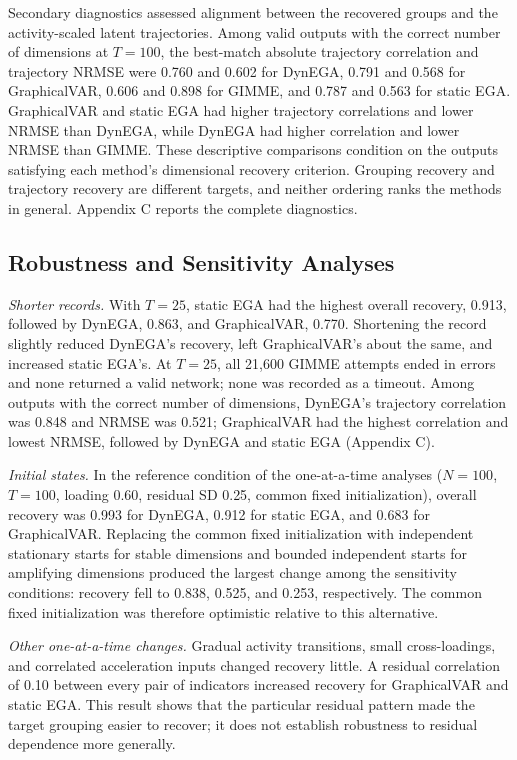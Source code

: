 \documentclass[
]{article}
\begin{document}
Secondary diagnostics assessed alignment between the recovered groups
and the activity-scaled latent trajectories. Among valid outputs with
the correct number of dimensions at \(T=100\), the best-match absolute
trajectory correlation and trajectory NRMSE were 0.760 and 0.602 for
DynEGA, 0.791 and 0.568 for GraphicalVAR, 0.606 and 0.898 for GIMME, and
0.787 and 0.563 for static EGA. GraphicalVAR and static EGA had higher
trajectory correlations and lower NRMSE than DynEGA, while DynEGA had
higher correlation and lower NRMSE than GIMME. These descriptive
comparisons condition on the outputs satisfying each method's
dimensional recovery criterion. Grouping recovery and trajectory
recovery are different targets, and neither ordering ranks the methods
in general. Appendix C reports the complete diagnostics.

\subsection{Robustness and Sensitivity
Analyses}\label{robustness-and-sensitivity-analyses}

\emph{Shorter records.} With \(T=25\), static EGA had the highest
overall recovery, 0.913, followed by DynEGA, 0.863, and GraphicalVAR,
0.770. Shortening the record slightly reduced DynEGA's recovery, left
GraphicalVAR's about the same, and increased static EGA's. At \(T=25\),
all 21,600 GIMME attempts ended in errors and none returned a valid
network; none was recorded as a timeout. Among outputs with the correct
number of dimensions, DynEGA's trajectory correlation was 0.848 and
NRMSE was 0.521; GraphicalVAR had the highest correlation and lowest
NRMSE, followed by DynEGA and static EGA (Appendix C).

\emph{Initial states.} In the reference condition of the one-at-a-time
analyses (\(N=100\), \(T=100\), loading 0.60, residual SD 0.25, common
fixed initialization), overall recovery was 0.993 for DynEGA, 0.912 for
static EGA, and 0.683 for GraphicalVAR. Replacing the common fixed
initialization with independent stationary starts for stable dimensions
and bounded independent starts for amplifying dimensions produced the
largest change among the sensitivity conditions: recovery fell to 0.838,
0.525, and 0.253, respectively. The common fixed initialization was
therefore optimistic relative to this alternative.

\emph{Other one-at-a-time changes.} Gradual activity transitions, small
cross-loadings, and correlated acceleration inputs changed recovery
little. A residual correlation of 0.10 between every pair of indicators
increased recovery for GraphicalVAR and static EGA. This result shows
that the particular residual pattern made the target grouping easier to
recover; it does not establish robustness to residual dependence more
generally.
\end{document}

